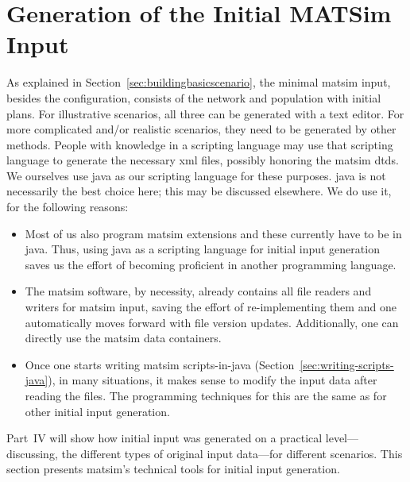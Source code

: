 \section{Generation of the Initial MATSim Input}
\label{sec:extending:initial-input}

As explained in Section~\ref{sec:buildingbasicscenario}, the minimal \gls{matsim} input, besides the configuration, consists of the network and population with initial plans.  For illustrative scenarios, all three can be generated with a text editor.  For more complicated and/or realistic scenarios, they need to be generated by other methods.  People with knowledge in a scripting language may use that scripting language to generate the necessary \gls{xml} files, possibly honoring the \gls{matsim} \glspl{dtd}.  We ourselves use \gls{java} as our scripting language for these purposes.  \gls{java} is not necessarily the best choice here; this may be discussed elsewhere.  We do use it, for the following reasons:
\begin{itemize}

\item Most of us also program \gls{matsim} extensions and these currently have to be in \gls{java}.  Thus, using \gls{java} as a scripting language for initial input generation saves us the effort of becoming proficient in another programming language.

\item The \gls{matsim} software, by necessity, already contains all file readers and writers for \gls{matsim} input, saving the effort of re-implementing them and one automatically moves forward with file version updates.  Additionally, one can directly use the \gls{matsim} data containers.

\item Once one starts writing \gls{matsim} scripts-in-\gls{java} (Section~\ref{sec:writing-scripts-java}), in many situations, it makes sense to modify the input data after reading the files.  The programming techniques for this are the same as for other initial input generation.

\end{itemize}
Part~IV will show how initial input was generated on a practical level---discussing, \eg the different types of original input data---for different scenarios.  This section  presents \gls{matsim}'s technical tools for initial input generation.
%
%

